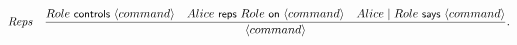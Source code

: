 \begin{footnotesize}
  \begin{gather*}
    \irule{Role \controls \action{command} \quad
      \reps{Alice}{Role}{\action{command}} \quad Alice \quoting Role
      \says \action{command}}{\action{command}}{Reps}.
  \end{gather*}
\end{footnotesize}





